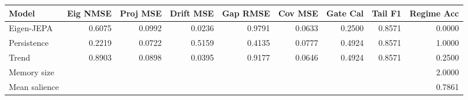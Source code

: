 \begin{tabular}{lrrrrrrrr}
\toprule
Model & Eig NMSE & Proj MSE & Drift MSE & Gap RMSE & Cov MSE & Gate Cal & Tail F1 & Regime Acc \\
\midrule
Eigen-JEPA & 0.6075 & 0.0992 & 0.0236 & 0.9791 & 0.0633 & 0.2500 & 0.8571 & 0.0000 \\
Persistence & 0.2219 & 0.0722 & 0.5159 & 0.4135 & 0.0777 & 0.4924 & 0.8571 & 1.0000 \\
Trend & 0.8903 & 0.0898 & 0.0395 & 0.9177 & 0.0646 & 0.4924 & 0.8571 & 0.2500 \\
\midrule
Memory size & \multicolumn{8}{r}{2.0000} \\
Mean salience & \multicolumn{8}{r}{0.7861} \\
\bottomrule
\end{tabular}